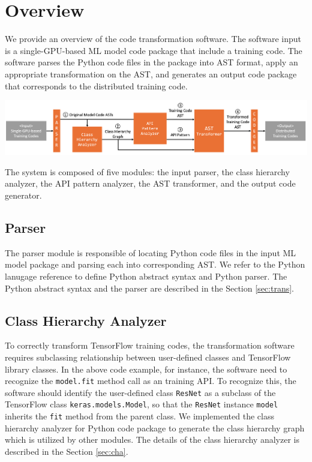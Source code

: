 \section{Overview}

We provide an overview of the code transformation software.
The software input is a single-GPU-based ML model code package
that include a training code.
The software parses the Python code files in the package
into AST format, apply an appropriate transformation on the AST,
and generates an output code package that corresponds to
the distributed training code.

\includegraphics[width=1\textwidth]{system_arch}

The system is composed of five modules: the input parser,
the class hierarchy analyzer, the API pattern analyzer,
the AST transformer, and the output code generator.

\subsection{Parser}

The parser module is responsible of locating Python code files in the
input ML model package and parsing each into corresponding AST.
We refer to the Python lanugage reference\cite{pythonref}
to define Python abstract syntax and Python parser.
The Python abstract syntax and the parser 
are described in the Section \ref{sec:trans}.

\subsection{Class Hierarchy Analyzer}


\vspace{-3em}
\begin{figure}[h]
  
\end{figure}
\vspace{-3em}

To correctly transform TensorFlow training codes,
the transformation software requires subclassing relationship
between user-defined classes and TensorFlow library classes.
In the above code example, for instance, the software need to recognize
the {\tt model.fit} method call as an training API.
To recognize this, the software should identify the user-defined class
{\tt ResNet} as a subclass of the TensorFlow class {\tt keras.models.Model},
so that the {\tt ResNet} instance {\tt model} inherits the {\tt fit}
method from the parent class. 
We implemented the class hierarchy analyzer for Python code package
to generate the class hierarchy graph which is utilized by
other modules. The details of the class hierarchy analyzer is
described in the Section \ref{sec:cha}.

